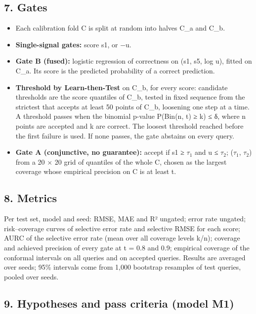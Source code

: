 \hypertarget{7-gates}{%
\subsection{7. Gates}\label{7-gates}}

\begin{itemize}
\tightlist
\item
  Each calibration fold C is split at random into halves C\_a and C\_b.
\item
  \textbf{Single-signal gates:} score s1, or −u.
\item
  \textbf{Gate B (fused):} logistic regression of correctness on (s1,
  s5, log u), fitted on C\_a. Its score is the predicted probability of
  a correct prediction.
\item
  \textbf{Threshold by Learn-then-Test} on C\_b, for every score:
  candidate thresholds are the score quantiles of C\_b, tested in fixed
  sequence from the strictest that accepts at least 50 points of C\_b,
  loosening one step at a time. A threshold passes when the binomial
  p-value P(Bin(n, t) ≥ k) ≤ δ, where n points are accepted and k are
  correct. The loosest threshold reached before the first failure is
  used. If none passes, the gate abstains on every query.
\item
  \textbf{Gate A (conjunctive, no guarantee):} accept if s1 ≥ $\tau_1$ and u ≤
  $\tau_2$; ($\tau_1$, $\tau_2$) from a 20 × 20 grid of quantiles of the whole C, chosen
  as the largest coverage whose empirical precision on C is at least t.
\end{itemize}

\hypertarget{8-metrics}{%
\subsection{8. Metrics}\label{8-metrics}}

Per test set, model and seed: RMSE, MAE and R² ungated; error rate
ungated; risk--coverage curves of selective error rate and selective
RMSE for each score; AURC of the selective error rate (mean over all
coverage levels k/n); coverage and achieved precision of every gate at t
= 0.8 and 0.9; empirical coverage of the conformal intervals on all
queries and on accepted queries. Results are averaged over seeds; 95\%
intervals come from 1,000 bootstrap resamples of test queries, pooled
over seeds.

\hypertarget{9-hypotheses-and-pass-criteria-model-m1}{%
\subsection{9. Hypotheses and pass criteria (model
M1)}\label{9-hypotheses-and-pass-criteria-model-m1}}


